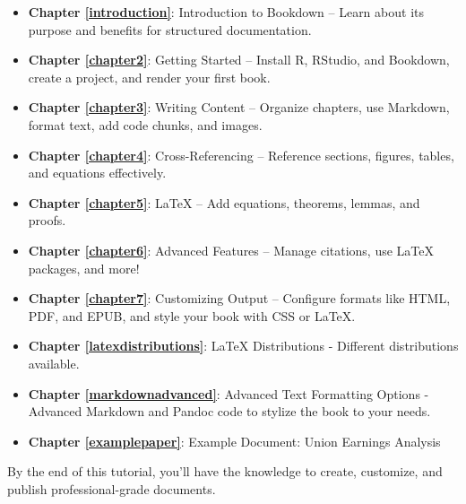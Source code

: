 \documentclass[
]{book}
\providecommand{\tightlist}{%
  \setlength{\itemsep}{0pt}\setlength{\parskip}{0pt}}
\begin{document}
\begin{itemize}
\tightlist
\item
  \textbf{Chapter \ref{introduction}}: Introduction to Bookdown -- Learn about its purpose and benefits for structured documentation.
\item
  \textbf{Chapter \ref{chapter2}}: Getting Started -- Install R, RStudio, and Bookdown, create a project, and render your first book.
\item
  \textbf{Chapter \ref{chapter3}}: Writing Content -- Organize chapters, use Markdown, format text, add code chunks, and images.
\item
  \textbf{Chapter \ref{chapter4}}: Cross-Referencing -- Reference sections, figures, tables, and equations effectively.
\item
  \textbf{Chapter \ref{chapter5}}: LaTeX -- Add equations, theorems, lemmas, and proofs.
\item
  \textbf{Chapter \ref{chapter6}}: Advanced Features -- Manage citations, use LaTeX packages, and more!
\item
  \textbf{Chapter \ref{chapter7}}: Customizing Output -- Configure formats like HTML, PDF, and EPUB, and style your book with CSS or LaTeX.
\item
  \textbf{Chapter \ref{latexdistributions}}: LaTeX Distributions - Different distributions available.
\item
  \textbf{Chapter \ref{markdownadvanced}}: Advanced Text Formatting Options - Advanced Markdown and Pandoc code to stylize the book to your needs.
\item
  \textbf{Chapter \ref{examplepaper}}: Example Document: Union Earnings Analysis
\end{itemize}

By the end of this tutorial, you'll have the knowledge to create, customize, and publish professional-grade documents.

  
\end{document}
